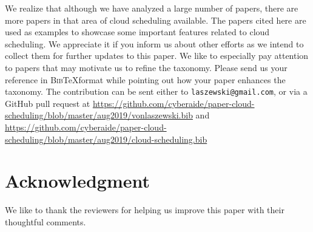 \documentclass[final,5p,times,twocolumn]{elsarticle}
\begin{document}
We realize that although we have analyzed a large number of papers, there are more papers in that area of cloud scheduling available. The papers cited here are used as examples to showcase some important features related to cloud scheduling. We appreciate it if you inform us about other efforts as we intend to collect them for further updates to this paper. We like to especially pay attention to papers that may motivate us to refine the taxonomy. Please send us your reference in \textsc{Bib}\TeX format while pointing out how your paper enhances the taxonomy. The contribution can be sent either to \verb|laszewski@gmail.com|, or via a GitHub pull request at \url{https://github.com/cyberaide/paper-cloud-scheduling/blob/master/aug2019/vonlaszewski.bib} and \url{https://github.com/cyberaide/paper-cloud-scheduling/blob/master/aug2019/cloud-scheduling.bib}

\section*{Acknowledgment}

We like to thank the reviewers for helping us improve this paper with their thoughtful comments.

%




















\clearpage

\appendix


\end{document}
